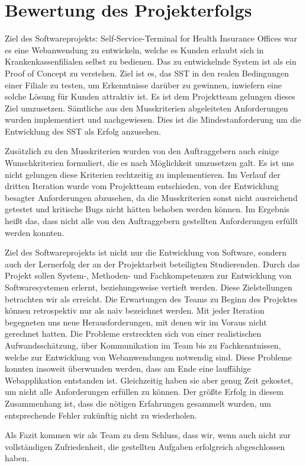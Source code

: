 \section{Bewertung des Projekterfolgs}

Ziel des Softwareprojekts: \glqq Self-Service-Terminal for Health Insurance Offices\grqq{} war es eine Webanwendung zu entwickeln, welche es Kunden erlaubt sich in Krankenkassenfilialen selbst zu bedienen. Das zu entwickelnde System ist als ein \glqq Proof of Concept\grqq{} zu verstehen. Ziel ist es, das SST in den realen Bedingungen einer Filiale zu testen, um Erkenntnisse darüber zu gewinnen, inwiefern eine solche Lösung für Kunden attraktiv ist. Es ist dem Projektteam gelungen dieses Ziel umzusetzen. Sämtliche aus den Musskriterien abgeleiteten Anforderungen wurden implementiert und nachgewiesen. Dies ist die Mindestanforderung um die Entwicklung des SST als Erfolg anzusehen.\par
\noindent Zusätzlich zu den Musskriterien wurden von den Auftraggebern auch einige Wunschkriterien formuliert, die es nach Möglichkeit umzusetzen galt. Es ist uns nicht gelungen diese Kriterien rechtzeitig zu implementieren. Im Verlauf der dritten Iteration wurde vom Projektteam entschieden, von der Entwicklung besagter Anforderungen abzusehen, da die Musskriterien sonst nicht ausreichend getestet und kritische Bugs nicht hätten behoben werden können. Im Ergebnis heißt das, dass nicht alle von den Auftraggebern gestellten Anforderungen erfüllt werden konnten.\par
\noindent Ziel des Softwareprojekts ist nicht nur die Entwicklung von Software, sondern auch der Lernerfolg der an der Projektarbeit beteiligten Studierenden. Durch das Projekt sollen System-, Methoden- und Fachkompetenzen zur Entwicklung von Softwaresystemen erlernt, beziehungsweise vertieft werden. Diese Zielstellungen betrachten wir als erreicht. Die Erwartungen des Teams zu Beginn des Projektes können retrospektiv nur als naiv bezeichnet werden. Mit jeder Iteration begegneten uns neue Herausforderungen, mit denen wir im Voraus nicht gerechnet hatten. Die Probleme erstreckten sich von einer realistischen Aufwandsschätzung, über Kommunikation im Team bis zu Fachkenntnissen, welche zur Entwicklung von Webanwendungen notwendig sind. Diese Probleme konnten insoweit überwunden werden, dass am Ende eine lauffähige Webapplikation entstanden ist. Gleichzeitig haben sie aber genug Zeit gekostet, um nicht alle Anforderungen erfüllen zu können. Der größte Erfolg in diesem Zusammenhang ist, dass die nötigen Erfahrungen gesammelt wurden, um entsprechende Fehler zukünftig nicht zu wiederholen.\par
\noindent Als Fazit kommen wir als Team zu dem Schluss, dass wir, wenn auch nicht zur vollständigen Zufriedenheit, die gestellten Aufgaben erfolgreich abgeschlossen haben. 